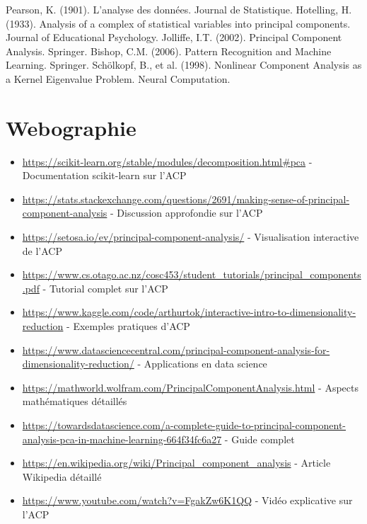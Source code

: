 \documentclass[a4paper,12pt]{report}
\begin{document}
\begin{thebibliography}{9}
 Pearson, K. (1901). L'analyse des données. Journal de Statistique.
 Hotelling, H. (1933). Analysis of a complex of statistical variables into principal components. Journal of Educational Psychology.
 Jolliffe, I.T. (2002). Principal Component Analysis. Springer.
 Bishop, C.M. (2006). Pattern Recognition and Machine Learning. Springer.
 Schölkopf, B., et al. (1998). Nonlinear Component Analysis as a Kernel Eigenvalue Problem. Neural Computation.
\end{thebibliography}

\chapter*{Webographie}
\begin{itemize}
  \item \url{https://scikit-learn.org/stable/modules/decomposition.html#pca} - Documentation scikit-learn sur l'ACP
  \item \url{https://stats.stackexchange.com/questions/2691/making-sense-of-principal-component-analysis} - Discussion approfondie sur l'ACP
  \item \url{https://setosa.io/ev/principal-component-analysis/} - Visualisation interactive de l'ACP
  \item \url{https://www.cs.otago.ac.nz/cosc453/student_tutorials/principal_components.pdf} - Tutorial complet sur l'ACP
  \item \url{https://www.kaggle.com/code/arthurtok/interactive-intro-to-dimensionality-reduction} - Exemples pratiques d'ACP
  \item \url{https://www.datasciencecentral.com/principal-component-analysis-for-dimensionality-reduction/} - Applications en data science
  \item \url{https://mathworld.wolfram.com/PrincipalComponentAnalysis.html} - Aspects mathématiques détaillés
  \item \url{https://towardsdatascience.com/a-complete-guide-to-principal-component-analysis-pca-in-machine-learning-664f34fc6a27} - Guide complet
  \item \url{https://en.wikipedia.org/wiki/Principal_component_analysis} - Article Wikipedia détaillé
  \item \url{https://www.youtube.com/watch?v=FgakZw6K1QQ} - Vidéo explicative sur l'ACP
\end{itemize}
\end{document}
